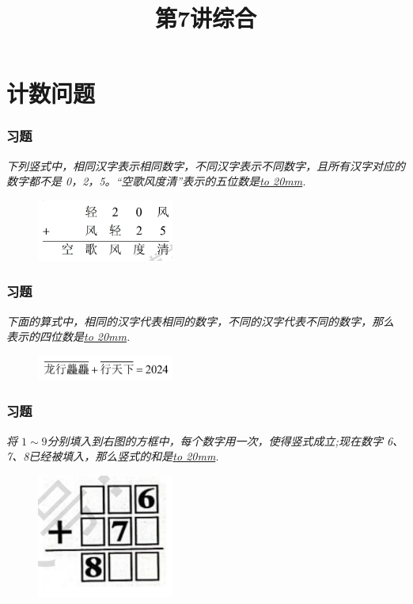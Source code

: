 \section{计数问题}

\title[第7讲\quad 综合]{第7讲\quad 综合} 
\author{}
\date{}

\begin{frame}
    \titlepage
\end{frame}

\setcounter{framecounter}{0}

\begin{frame}
    \frametitle{习题\theframecounter}
    \textit{下列竖式中，相同汉字表示相同数字，不同汉字表示不同数字，且所有汉字对应的数字都不是 0，2，5。“空歌风度清”表示的五位数是\underline{\hbox to 20mm{}}.}
    \begin{figure}[H] 
        \centering
        \includegraphics[width=0.4\textwidth]{./pics/Chapter_7/1.png}
    \end{figure}
\end{frame}

\begin{frame}
    \frametitle{习题\theframecounter}
    \textit{下面的算式中，相同的汉字代表相同的数字，不同的汉字代表不同的数字，那么  表示的四位数是\underline{\hbox to 20mm{}}.}
    \begin{figure}[H] 
        \centering
        \includegraphics[width=0.4\textwidth]{./pics/Chapter_7/2.png}
    \end{figure}
\end{frame}

\begin{frame}
    \frametitle{习题\theframecounter}
    \textit{将 $1\sim 9$分别填入到右图的方框中，每个数字用一次，使得竖式成立;现在数字 6、7、8已经被填入，那么竖式的和是\underline{\hbox to 20mm{}}.}
    \begin{figure}[H] 
        \centering
        \includegraphics[width=0.4\textwidth]{./pics/Chapter_7/3.png}
    \end{figure}
\end{frame}

